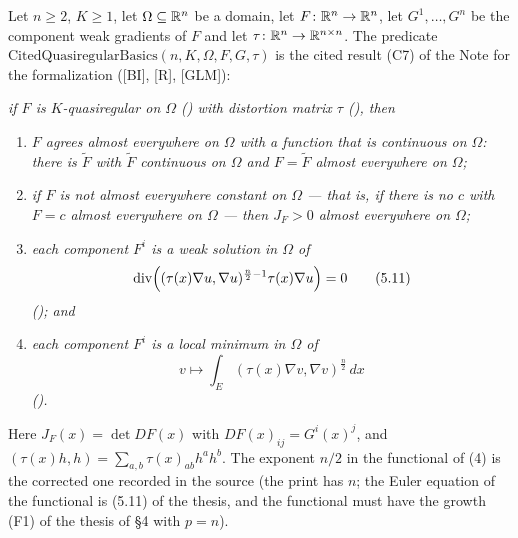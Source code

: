 \begin{definition}
Let $n\ge2$, $K\ge1$, let $\Omega\subseteq\mathbb{R}^n$ be a domain, let
$F\colon\mathbb{R}^n\to\mathbb{R}^n$, let $G^1,\dots,G^n$ be the component weak gradients of $F$
and let $\tau\colon\mathbb{R}^n\to\mathbb{R}^{n\times n}$.  The predicate
$\mathrm{CitedQuasiregularBasics}(n,K,\Omega,F,G,\tau)$ is the cited result (C7)
of the Note for the formalization ([BI], [R], [GLM]):

\emph{if $F$ is $K$-quasiregular on $\Omega$ () with
distortion matrix $\tau$ (), then}
\begin{enumerate}
\item \emph{$F$ agrees almost everywhere on $\Omega$ with a function that is
  continuous on $\Omega$: there is $\widetilde F$ with $\widetilde F$ continuous
  on $\Omega$ and $F=\widetilde F$ almost everywhere on $\Omega$;}
\item \emph{if $F$ is not almost everywhere constant on $\Omega$ --- that is, if
  there is no $c$ with $F=c$ almost everywhere on $\Omega$ --- then $J_F>0$
  almost everywhere on $\Omega$;}
\item \emph{each component $F^i$ is a weak solution in $\Omega$ of
\[
\operatorname{div}\Bigl((\tau(x)\nabla u,\nabla u)^{\frac n2-1}\tau(x)\nabla u\Bigr)=0
\tag{5.11}
\]
(); and}
\item \emph{each component $F^i$ is a local minimum in $\Omega$ of
\[
v\longmapsto\int_E(\tau(x)\nabla v,\nabla v)^{\frac n2}\,dx
\]
().}
\end{enumerate}
Here $J_F(x)=\det DF(x)$ with $DF(x)_{ij}=G^i(x)^j$, and
$(\tau(x)h,h)=\sum_{a,b}\tau(x)_{ab}h^ah^b$.  The exponent $n/2$ in the
functional of (4) is the corrected one recorded in the source (the print has
$n$; the Euler equation of the functional is (5.11) of the thesis, and the functional
must have the growth (F1) of the thesis of \S4 with $p=n$).


\end{definition}
